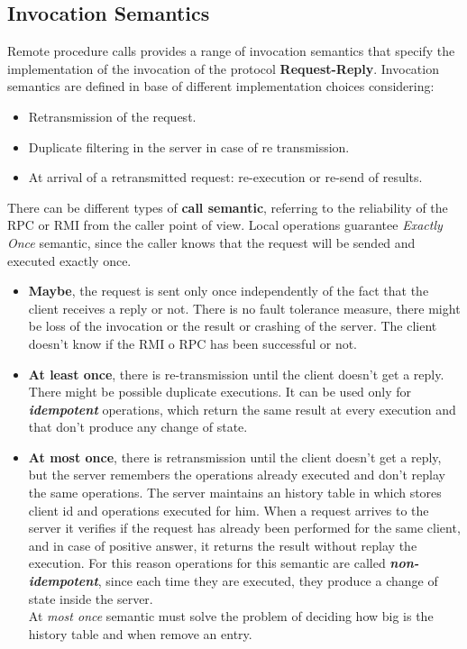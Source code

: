 \documentclass[11pt,a4paper]{article}
\begin{document}
\subsection{Invocation Semantics}
Remote procedure calls provides a range of invocation semantics that specify the implementation of the invocation of the protocol \textbf{Request-Reply}. Invocation semantics are defined in base of different implementation choices considering: 
\begin{itemize}
	\item Retransmission of the request.
	\item Duplicate filtering in the server in case of re transmission.
	\item At arrival of a retransmitted request: re-execution or re-send of results.
\end{itemize} 
There can be different types of \textbf{call semantic}, referring to the reliability of the RPC or RMI from the caller point of view. Local operations guarantee \textit{Exactly Once} semantic, since the caller knows that the request will be sended and executed exactly once.
\begin{itemize}
	\item \textbf{Maybe}, the request is sent only once independently of the fact that the client receives a reply or not. There is no fault tolerance measure, there might be loss of the invocation or the result or crashing of the server. The client doesn't know if the RMI o RPC has been successful or not.
	\item \textbf{At least once}, there is re-transmission until the client doesn't get a reply. There might be possible duplicate executions. It can be used only for \textbf{\textit{idempotent}} operations, which return the same result at every execution and that don't produce any change of state.
	\item \textbf{At most once}, there is retransmission until the client doesn't get a reply, but the server remembers the operations already executed and don't replay the same operations. The server maintains an history table in which stores client id and operations executed for him. When a request arrives to the server it verifies if the request has already been performed for the same client, and in case of positive answer, it returns the result without replay the execution. For this reason operations for this semantic are called \textit{\textbf{non-idempotent}}, since each time they are executed, they produce a change of state inside the server.\\
	At \textit{most once} semantic must solve the problem of deciding how big is the history table and when remove an entry.
\end{itemize}
\end{document}
